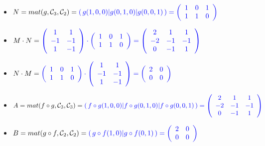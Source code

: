 \documentclass[a4paper,12pt]{article}
\newcommand{\add}[1]{\textcolor{blue}{#1}}
\begin{document}
\begin{exercice}
\begin{enumerate}
\begin{itemize}
            \item $N=mat(g,\mathcal C_3, \mathcal C_2) = \add{(\,g(1,0,0)|g(0,1,0)|g(0,0,1)\,)=\left(\begin{array}{ccc}1 & 0 & 1 \\ 1 & 1 & 0\end{array}\right)}$

            \item $M\cdot N = \add{\left(\begin{array}{cc} 1 &1\\ -1 & -1 \\ 1 & -1\end{array}\right)\cdot\left(\begin{array}{ccc}1 & 0 & 1 \\ 1 & 1 & 0\end{array}\right)=\left(\begin{array}{ccc}2 & 1 & 1 \\ -2 & -1 & -1 \\ 0 & -1 & 1\end{array}\right)}$

            \item $N\cdot M = \add{\left(\begin{array}{ccc}1 & 0 & 1 \\ 1 & 1 & 0\end{array}\right)\cdot\left(\begin{array}{cc} 1 & 1\\ -1 & -1 \\ 1 & -1\end{array}\right)=\left(\begin{array}{cc} 2 & 0 \\ 0 & 0\end{array}\right)}$

            \item $A=mat(f \circ g,\mathcal C_3,\mathcal C_3)=\add{(\,f \circ g(1,0,0)|f \circ g(0,1,0)|f \circ g(0,0,1)\,)=\left(\begin{array}{ccc}2 & 1 & 1 \\ -2 & -1 & -1 \\ 0 & -1 & 1\end{array}\right)}$

                \item $B=mat(g\circ f,\mathcal C_2, \mathcal C_2)=\add{(\,g\circ f(1,0)|g\circ f(0,1)\,)=\left(\begin{array}{cc}2 & 0 \\ 0 & 0\end{array}\right)}$


\end{itemize}
\end{enumerate}
\end{exercice}
\end{document}
